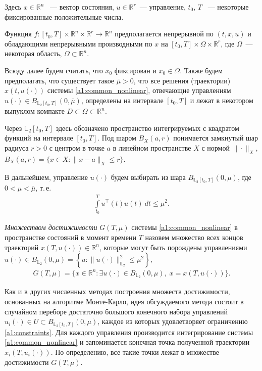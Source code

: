\documentclass[../main.tex]{subfiles}
\begin{document}
  Здесь $ x \in \mathbb{R}^n $ ~--- вектор состояния, $ u \in \mathbb{R}^r $~--- управление,  $t_0$, $ {T} $ ~--- некоторые фиксированные положительные числа.
  
  Функция $ f: [t_0, {T}] \times  \mathbb{R}^n \times \mathbb{R}^r \rightarrow \mathbb{R}^{n} $ предполагается непрерывной по $(t,x,u)$ и обладающими непрерывными производными по $ x $ на  $ [t_0, {T}] \times \Omega \times \mathbb{R}^r $, где $\Omega$~--- некоторая область, $\Omega \subset \mathbb{R}^n$.  
  
  Всюду далее будем считать, что $x_0$ фиксирован и  $x_0 \in  \Omega $.
  Также будем предполагать, что существует такое $\overline{\mu} > 0 $, что все решения (траектории) $ x(t, u(\cdot)) $ системы \eqref{a1:common_nonlinear}, отвечающие управлениям $u(\cdot) \in B_{\mathbb{L}_2[t_0, {T}]}(0,\overline{\mu})$,  определены на интервале $ [t_0,{T}] $ и лежат в некотором выпуклом компакте $D \subset \Omega \subset \mathbb{R}^n$. 
  
  Через $\mathbb{L}_2[t_0, {T}]$ здесь обозначено пространство интегрируемых с квадратом функций на интервале $[t_0, {T}]$. 
  Под шаром $B_X(a,r)$ понимается замкнутый шар радиуса $r>0$ с центром в точке $a$ в линейном пространстве $X$ с нормой $\|\cdot\|_X$, $B_X(a, r) = \{x\in X: \|x-a\|_X \leqslant r \}$.
  
  В дальнейшем, управление $ u(\cdot) $ будем выбирать из шара $ B_{\mathbb{L}_2[t_0, {T}]}(0,\mu) $, где $ 0 < \mu < \overline{\mu} $, т.\,е.
  \begin{gather}\label{a1:constraints}
  	\int\limits_{t_0}^T u^{\top}(t) u(t) \ dt \leqslant \mu^2.
  \end{gather}
  
  {\sl Множеством достижимости } $ G(T,\mu) $ системы \eqref{a1:common_nonlinear} в пространстве состояний в момент времени $ T $ назовем множество всех концов траекторий $ x(T, u(\cdot)) \in \mathbb{R}^n $,  которые могут быть порождены управлениями $ u(\cdot) \in B_{\mathbb{L}_2}(0,\mu) =\left\lbrace u:\lVert u(\cdot)\rVert^2_{\mathbb{L}_2} \leqslant \mu^2\right\rbrace  $,
  \begin{gather*}
  	G(T,\mu)=\{x\in \mathbb{R}^n:\exists u(\cdot)\in B_{\mathbb{L}_2}(0,\mu),\; x=x(T,u(\cdot))\}.
  \end{gather*}
  
  Как и в других численных методах построения множеств достижимости, основанных на алгоритме Монте-Карло, идея обсуждаемого метода состоит в случайном переборе достаточно большого конечного набора управлений $u_i(\cdot) \in U \subset B_{\mathbb{L}_2[t_0, {T}]}(0,\mu) $, каждое из которых удовлетворяет ограничению \eqref{a1:constraints}.
  Для каждого управления производится интегрирование системы \eqref{a1:common_nonlinear} и запоминается конечная точка полученной траектории $x_i(T, u_i(\cdot))$. 
  По определению, все такие точки лежат в множестве достижимости $G(T,\mu)$.
  
\end{document}
